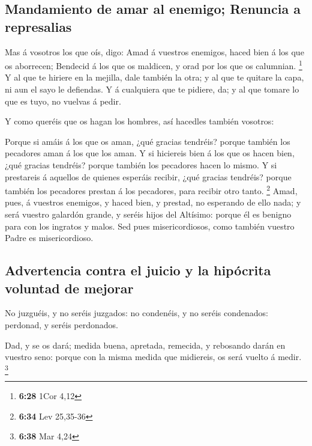 \hypertarget{mandamiento-de-amar-al-enemigo-renuncia-a-represalias}{%
\subsection{Mandamiento de amar al enemigo; Renuncia a
represalias}\label{mandamiento-de-amar-al-enemigo-renuncia-a-represalias}}

 Mas á vosotros los que oís, digo: Amad á vuestros
enemigos, haced bien á los que os aborrecen;  Bendecid á
los que os maldicen, y orad por los que os calumnian. \footnote{\textbf{6:28}
  1Cor 4,12}  Y al que te hiriere en la mejilla, dale
también la otra; y al que te quitare la capa, ni aun el sayo le
defiendas.  Y á cualquiera que te pidiere, da; y al que
tomare lo que es tuyo, no vuelvas á pedir.

 Y como queréis que os hagan los hombres, así hacedles
también vosotros:

 Porque si amáis á los que os aman, ¿qué gracias
tendréis? porque también los pecadores aman á los que los aman.
 Y si hiciereis bien á los que os hacen bien, ¿qué
gracias tendréis? porque también los pecadores hacen lo mismo.
 Y si prestareis á aquellos de quienes esperáis recibir,
¿qué gracias tendréis? porque también los pecadores prestan á los
pecadores, para recibir otro tanto. \footnote{\textbf{6:34} Lev 25,35-36}
 Amad, pues, á vuestros enemigos, y haced bien, y
prestad, no esperando de ello nada; y será vuestro galardón grande, y
seréis hijos del Altísimo: porque él es benigno para con los ingratos y
malos.  Sed pues misericordiosos, como también vuestro
Padre es misericordioso.

\hypertarget{advertencia-contra-el-juicio-y-la-hipuxf3crita-voluntad-de-mejorar}{%
\subsection{Advertencia contra el juicio y la hipócrita voluntad de
mejorar}\label{advertencia-contra-el-juicio-y-la-hipuxf3crita-voluntad-de-mejorar}}

 No juzguéis, y no seréis juzgados: no condenéis, y no
seréis condenados: perdonad, y seréis perdonados.

 Dad, y se os dará; medida buena, apretada, remecida, y
rebosando darán en vuestro seno: porque con la misma medida que
midiereis, os será vuelto á medir. \footnote{\textbf{6:38} Mar 4,24}

